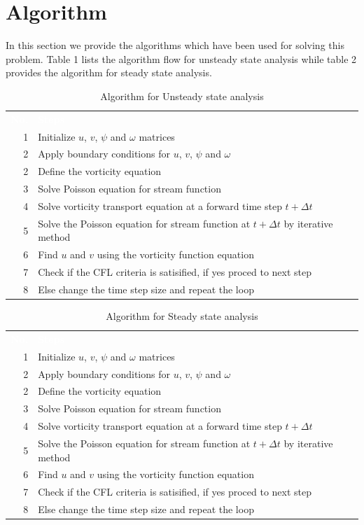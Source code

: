 \documentclass{article}
\newcommand{\head}[1]{%
   \textcolor{white}{\textbf{#1}}}
\begin{document}
\section{Algorithm}
In this section we provide the algorithms which have been used for solving this problem. Table 1 lists the algorithm flow for unsteady state analysis while table 2 provides the algorithm for steady state analysis.
\begin{table}[ht]
   \centering
   \sffamily
   \begin{tabular}{rlr}
     \rowcolor{black!75}
      \head{No.}& \head{Steps}  \\
     1 & Initialize $u$, $v$, $\psi$ and $\omega$ matrices        \\
     2 & Apply boundary conditions for $u$, $v$, $\psi$ and $\omega$ \\
     2 & Define the vorticity equation    \\
     3 & Solve Poisson equation for stream function    \\
     4 & Solve vorticity transport equation at a forward time step $t+\Delta t$ \\
     5 & Solve the Poisson equation for stream function at  $t+\Delta t$ by iterative method  \\
     6 & Find $u$ and $v$ using the vorticity function equation      \\
     7 & Check if the CFL criteria is satisified, if yes proced to next step     \\
     8 & Else change the time step size and repeat the loop     \\
  \end{tabular}
  \caption{Algorithm for Unsteady state analysis}
\end{table}

\begin{table}[ht]
   \centering
   \sffamily
   \begin{tabular}{rlr}
     \rowcolor{black!75}
      \head{No.}& \head{Steps}  \\
     1 & Initialize $u$, $v$, $\psi$ and $\omega$ matrices        \\
     2 & Apply boundary conditions for $u$, $v$, $\psi$ and $\omega$ \\
     2 & Define the vorticity equation    \\
     3 & Solve Poisson equation for stream function    \\
     4 & Solve vorticity transport equation at a forward time step $t+\Delta t$ \\
     5 & Solve the Poisson equation for stream function at  $t+\Delta t$ by iterative method  \\
     6 & Find $u$ and $v$ using the vorticity function equation      \\
     7 & Check if the CFL criteria is satisified, if yes proced to next step     \\
     8 & Else change the time step size and repeat the loop     \\
  \end{tabular}
  \caption{Algorithm for Steady state analysis}
\end{table}
\end{document}
